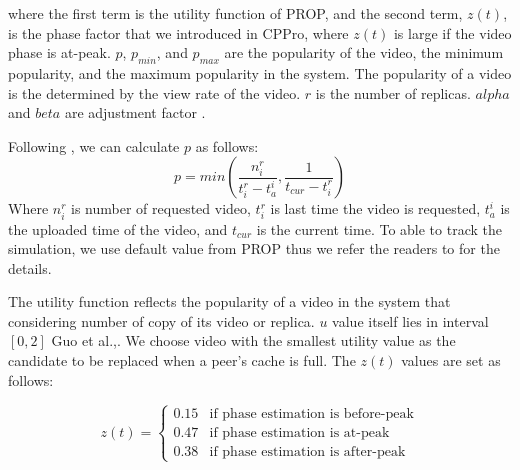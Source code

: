\documentclass[10pt,final,journal,a4paper]{IEEEtran}
\begin{document}
where the first term is the utility function of PROP, and the second term, $z(t)$, is the phase factor that we introduced in CPPro, where $z(t)$ is large if the video phase is at-peak.
$p$, $p_{min}$, and $p_{max}$ are the popularity of the video, the minimum popularity, and the maximum popularity in the system.
The popularity of a video is the determined by the view rate of the video.
$r$ is the number of replicas. 
$alpha$ and $beta$ are adjustment factor \cite{1613869}.

Following \cite{1613869}, we can calculate $p$ as follows:
\begin{equation}
p = min \left(\frac{n_i^r}{t_i^r - t_a^i}  , \frac{1}{t_{cur} - t_i^r}\right)
\end{equation}
Where $n_i^r$ is number of requested video, $t_i^r$ is last time the video is requested, $t_a^i$ is the uploaded time of the video, and $t_{cur}$ is the current time.
To able to track the simulation, we use default value from PROP thus we refer the readers to \cite{1613869} for the details.

The utility function reflects the popularity of a video in the system that considering number of copy of its video or replica. 
$u$ value itself lies in interval $[0,2]$ Guo et al.,\cite{1613869}.
We choose video with the smallest utility value as the candidate to be replaced when a peer's cache is full.
The $z(t)$ values are set as follows:


\begin{equation}
 z(t) = 
  \begin{cases}
   0.15 & \text{if phase estimation is before-peak} \\
   0.47 & \text{if phase estimation is at-peak} \\
   0.38 & \text{if phase estimation is after-peak}
  \end{cases}
\end{equation}\label{eq:zfactor}
\end{document}
